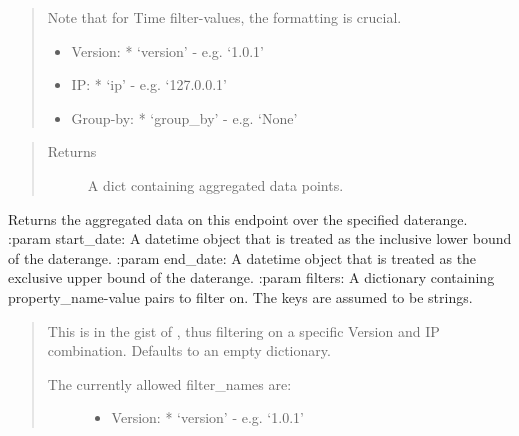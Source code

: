 \documentclass[letterpaper,10pt,english]{sphinxmanual}
\begin{document}
\begin{fulllineitems}
\begin{fulllineitems}
\begin{quote}
\begin{description}
\begin{itemize}
\end{itemize}

Note that for Time filter-values, the formatting is crucial.
\begin{itemize}
\item {} 
Version:
* ‘version’ - e.g. ‘1.0.1’

\item {} 
IP:
* ‘ip’ - e.g. ‘127.0.0.1’

\item {} 
Group-by:
* ‘group\_by’ - e.g. ‘None’

\end{itemize}

\end{description}
\end{quote}
\begin{quote}\begin{description}
\item[{Returns}] \leavevmode
A dict containing aggregated data points.

\end{description}\end{quote}

\end{fulllineitems}


\begin{fulllineitems}
\label{\detokenize{pydash_app.dashboard.endpoint:pydash_app.dashboard.endpoint.Endpoint.aggregated_data_daterange}}
Returns the aggregated data on this endpoint over the specified daterange.
:param start\_date: A datetime object that is treated as the inclusive lower bound of the daterange.
:param end\_date: A datetime object that is treated as the exclusive upper bound of the daterange.
:param filters: A dictionary containing property\_name-value pairs to filter on. The keys are assumed to be strings.
\begin{quote}

This is in the gist of , thus filtering on a specific Version and IP combination.
Defaults to an empty dictionary.
\begin{description}
\item[{The currently allowed filter\_names are:}] \leavevmode\begin{itemize}
\item {} 
Version:
* ‘version’ - e.g. ‘1.0.1’


\end{itemize}
\end{description}
\end{quote}
\end{fulllineitems}
\end{fulllineitems}
\end{document}
